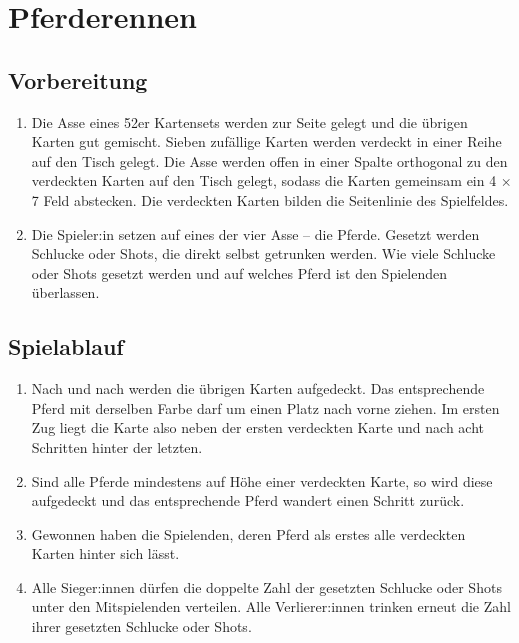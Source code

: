 \chapter{Pferderennen}
\section{Vorbereitung}
\begin{enumerate}[label={(\arabic*)}]    
    \item
    Die Asse eines 52er Kartensets werden zur Seite gelegt und die übrigen Karten gut gemischt.
    Sieben zufällige Karten werden verdeckt in einer Reihe auf den Tisch gelegt.
    Die Asse werden offen in einer Spalte orthogonal zu den verdeckten Karten auf den Tisch gelegt, sodass die Karten gemeinsam ein 4 \begin{math}\times\end{math} 7 Feld abstecken.
    Die verdeckten Karten bilden die Seitenlinie des Spielfeldes.

    \item
    Die Spieler:in setzen auf eines der vier Asse – die \glqq{}Pferde\grqq{}.
    Gesetzt werden Schlucke oder Shots, die direkt selbst getrunken werden.
    Wie viele Schlucke oder Shots gesetzt werden und auf welches Pferd ist den Spielenden überlassen.
\end{enumerate}

\section{Spielablauf}
\begin{enumerate}[label={(\arabic*)}]
    \item
    Nach und nach werden die übrigen Karten aufgedeckt.
    Das entsprechende Pferd mit derselben Farbe darf um einen Platz nach vorne ziehen.
    Im ersten Zug liegt die Karte also neben der ersten verdeckten Karte und nach acht Schritten hinter der letzten.

    \item
    Sind alle Pferde mindestens auf Höhe einer verdeckten Karte, so wird diese aufgedeckt und das entsprechende Pferd wandert einen Schritt zurück.

    \item
    Gewonnen haben die Spielenden, deren Pferd als erstes alle verdeckten Karten hinter sich lässt.

    \item
    Alle Sieger:innen dürfen die doppelte Zahl der gesetzten Schlucke oder Shots unter den Mitspielenden verteilen.
    Alle Verlierer:innen trinken erneut die Zahl ihrer gesetzten Schlucke oder Shots.
\end{enumerate}
